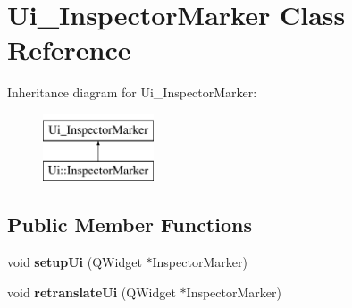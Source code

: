 \hypertarget{class_ui___inspector_marker}{}\section{Ui\+\_\+\+Inspector\+Marker Class Reference}
\label{class_ui___inspector_marker}
Inheritance diagram for Ui\+\_\+\+Inspector\+Marker\+:\begin{figure}[H]
\begin{center}
\leavevmode
\includegraphics[height=2.000000cm]{class_ui___inspector_marker}
\end{center}
\end{figure}
\subsection*{Public Member Functions}
\begin{DoxyCompactItemize}
\item 
\mbox{\label{class_ui___inspector_marker_a68f45730d6d6b8be8d7a1cf30d37d843}} 
void {\bfseries setup\+Ui} (Q\+Widget $\ast$Inspector\+Marker)
\item 
\mbox{\label{class_ui___inspector_marker_a792f40ebc87f1cd45021cbf851ff0ae9}} 
void {\bfseries retranslate\+Ui} (Q\+Widget $\ast$Inspector\+Marker)
\end{DoxyCompactItemize}
